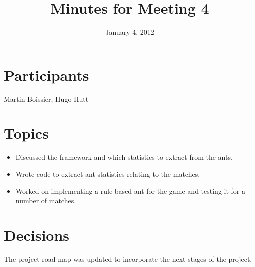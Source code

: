 \documentclass[a4paper, 11pt]{article}
\date{January 4, 2012}
\title{Minutes for Meeting 4}
\begin{document}
\maketitle

\section{Participants}

Martin Boissier, Hugo Hutt

\section{Topics}

\begin{itemize}
\item Discussed the framework and which statistics to extract from the
  ants.
\item Wrote code to extract ant statistics relating to the matches.
\item Worked on implementing a rule-based ant for the game and testing
  it for a number of matches.
\end{itemize}

\section{Decisions}

The project road map was updated to incorporate the next stages of the
project.
\end{document}
